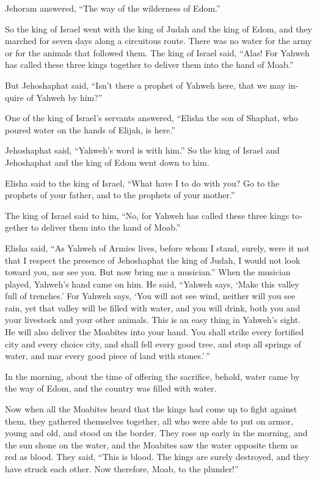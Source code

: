 \begin{paracol}{2}
\begin{otherlanguage}{english}
Jehoram answered, ``The way of the wilderness of Edom.''

 So the king of Israel went with the king of Judah and the
king of Edom, and they marched for seven days along a circuitous route.
There was no water for the army or for the animals that followed them.
 The king of Israel said, ``Alas! For Yahweh has called
these three kings together to deliver them into the hand of Moab.''

 But Jehoshaphat said, ``Isn't there a prophet of Yahweh
here, that we may inquire of Yahweh by him?''

One of the king of Israel's servants answered, ``Elisha the son of
Shaphat, who poured water on the hands of Elijah, is here.''

 Jehoshaphat said, ``Yahweh's word is with him.'' So the
king of Israel and Jehoshaphat and the king of Edom went down to him.

 Elisha said to the king of Israel, ``What have I to do
with you? Go to the prophets of your father, and to the prophets of your
mother.''

The king of Israel said to him, ``No, for Yahweh has called these three
kings together to deliver them into the hand of Moab.''

 Elisha said, ``As Yahweh of Armies lives, before whom I
stand, surely, were it not that I respect the presence of Jehoshaphat
the king of Judah, I would not look toward you, nor see you.
 But now bring me a musician.'' When the musician played,
Yahweh's hand came on him.  He said, ``Yahweh says, `Make
this valley full of trenches.'  For Yahweh says, `You
will not see wind, neither will you see rain, yet that valley will be
filled with water, and you will drink, both you and your livestock and
your other animals.  This is an easy thing in Yahweh's
sight. He will also deliver the Moabites into your hand. 
You shall strike every fortified city and every choice city, and shall
fell every good tree, and stop all springs of water, and mar every good
piece of land with stones.'\,''

 In the morning, about the time of offering the
sacrifice, behold, water came by the way of Edom, and the country was
filled with water.

 Now when all the Moabites heard that the kings had come
up to fight against them, they gathered themselves together, all who
were able to put on armor, young and old, and stood on the border.
 They rose up early in the morning, and the sun shone on
the water, and the Moabites saw the water opposite them as red as blood.
 They said, ``This is blood. The kings are surely
destroyed, and they have struck each other. Now therefore, Moab, to the
plunder!''


\end{otherlanguage}
\end{paracol}
